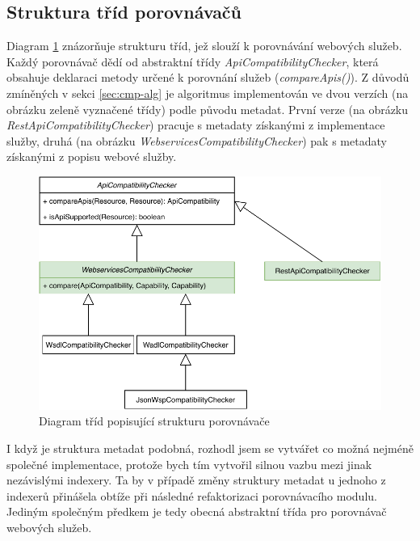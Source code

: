 \documentclass[czech,DP]{thesiskiv}
\begin{document}
\subsection{Struktura tříd porovnávačů}

Diagram \ref{fig:cmp-uml-class} znázorňuje strukturu tříd, jež slouží k porovnávání webových služeb. Každý porovnávač dědí od abstraktní třídy \textit{ApiCompatibilityChecker}, která obsahuje deklaraci metody určené k porovnání služeb (\textit{compareApis()}). Z důvodů zmíněných v sekci \ref{sec:cmp-alg} je algoritmus implementován ve dvou verzích (na obrázku zeleně vyznačené třídy) podle původu metadat. První verze (na obrázku \textit{RestApiCompatibilityChecker}) pracuje s metadaty získanými z implementace služby, druhá (na obrázku \textit{WebservicesCompatibilityChecker}) pak s metadaty získanými z popisu webové služby.


\begin{figure}[h]
	\centering
		\includegraphics[width=\linewidth]{cmp-uml-class}
	\caption{Diagram tříd popisující strukturu porovnávače}
	\label{fig:cmp-uml-class}
\end{figure}

I když je struktura metadat podobná, rozhodl jsem se vytvářet co možná nejméně společné implementace, protože bych tím vytvořil silnou vazbu mezi jinak nezávislými indexery. Ta by v případě změny struktury metadat u jednoho z indexerů přinášela obtíže při následné refaktorizaci porovnávacího modulu. Jediným společným předkem je tedy obecná abstraktní třída pro porovnávač webových služeb.
\end{document}
